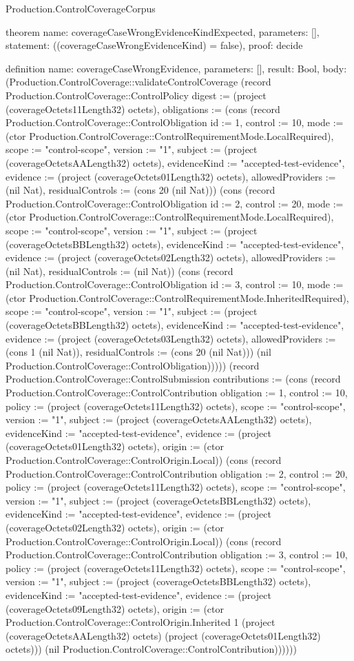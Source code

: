 \begin{lexlean}{Production.ControlCoverageCorpus}
\begin{semanticmodule}
theorem{
  name: coverageCaseWrongEvidenceKindExpected,
  parameters: [],
  statement: ((coverageCaseWrongEvidenceKind) = false),
  proof: decide{}
}

definition{
  name: coverageCaseWrongEvidence,
  parameters: [],
  result: Bool,
  body: (Production.ControlCoverage::validateControlCoverage (record Production.ControlCoverage::ControlPolicy {digest := (project (coverageOctets11Length32) octets), obligations := (cons (record Production.ControlCoverage::ControlObligation {id := 1, control := 10, mode := (ctor Production.ControlCoverage::ControlRequirementMode.LocalRequired), scope := "control-scope", version := "1", subject := (project (coverageOctetsAALength32) octets), evidenceKind := "accepted-test-evidence", evidence := (project (coverageOctets01Length32) octets), allowedProviders := (nil Nat), residualControls := (cons 20 (nil Nat))}) (cons (record Production.ControlCoverage::ControlObligation {id := 2, control := 20, mode := (ctor Production.ControlCoverage::ControlRequirementMode.LocalRequired), scope := "control-scope", version := "1", subject := (project (coverageOctetsBBLength32) octets), evidenceKind := "accepted-test-evidence", evidence := (project (coverageOctets02Length32) octets), allowedProviders := (nil Nat), residualControls := (nil Nat)}) (cons (record Production.ControlCoverage::ControlObligation {id := 3, control := 10, mode := (ctor Production.ControlCoverage::ControlRequirementMode.InheritedRequired), scope := "control-scope", version := "1", subject := (project (coverageOctetsBBLength32) octets), evidenceKind := "accepted-test-evidence", evidence := (project (coverageOctets03Length32) octets), allowedProviders := (cons 1 (nil Nat)), residualControls := (cons 20 (nil Nat))}) (nil Production.ControlCoverage::ControlObligation))))}) (record Production.ControlCoverage::ControlSubmission {contributions := (cons (record Production.ControlCoverage::ControlContribution {obligation := 1, control := 10, policy := (project (coverageOctets11Length32) octets), scope := "control-scope", version := "1", subject := (project (coverageOctetsAALength32) octets), evidenceKind := "accepted-test-evidence", evidence := (project (coverageOctets01Length32) octets), origin := (ctor Production.ControlCoverage::ControlOrigin.Local)}) (cons (record Production.ControlCoverage::ControlContribution {obligation := 2, control := 20, policy := (project (coverageOctets11Length32) octets), scope := "control-scope", version := "1", subject := (project (coverageOctetsBBLength32) octets), evidenceKind := "accepted-test-evidence", evidence := (project (coverageOctets02Length32) octets), origin := (ctor Production.ControlCoverage::ControlOrigin.Local)}) (cons (record Production.ControlCoverage::ControlContribution {obligation := 3, control := 10, policy := (project (coverageOctets11Length32) octets), scope := "control-scope", version := "1", subject := (project (coverageOctetsBBLength32) octets), evidenceKind := "accepted-test-evidence", evidence := (project (coverageOctets09Length32) octets), origin := (ctor Production.ControlCoverage::ControlOrigin.Inherited 1 (project (coverageOctetsAALength32) octets) (project (coverageOctets01Length32) octets))}) (nil Production.ControlCoverage::ControlContribution))))}))
}
\end{semanticmodule}
\end{lexlean}
